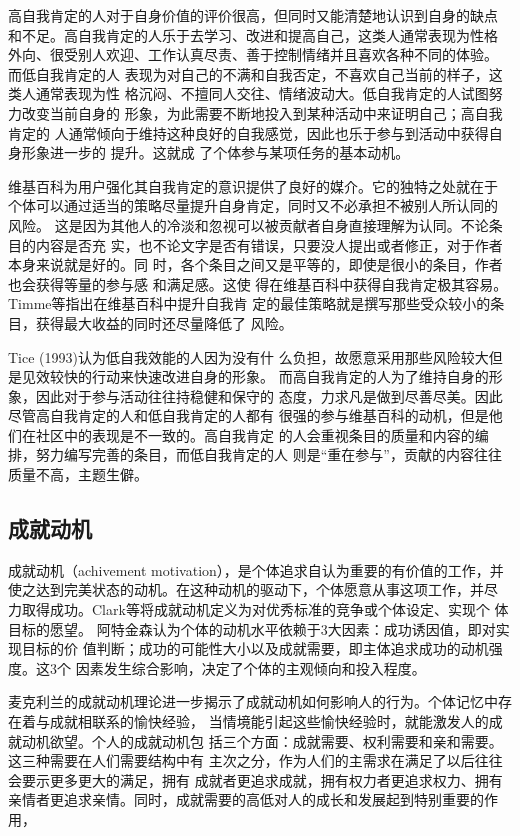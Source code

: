 高自我肯定的人对于自身价值的评价很高，但同时又能清楚地认识到自身的缺点
和不足。高自我肯定的人乐于去学习、改进和提高自己，这类人通常表现为性格
外向、很受别人欢迎、工作认真尽责、善于控制情绪并且喜欢各种不同的体验。
而低自我肯定的人
表现为对自己的不满和自我否定，不喜欢自己当前的样子，这类人通常表现为性
格沉闷、不擅同人交往、情绪波动大。低自我肯定的人试图努力改变当前自身的
形象，为此需要不断地投入到某种活动中来证明自己；高自我肯定的
人通常倾向于维持这种良好的自我感觉，因此也乐于参与到活动中获得自身形象进一步的
提升。这就成
了个体参与某项任务的基本动机。

维基百科为用户强化其自我肯定的意识提供了良好的媒介。它的独特之处就在于
个体可以通过适当的策略尽量提升自身肯定，同时又不必承担不被别人所认同的
风险。
这是因为其他人的冷淡和忽视可以被贡献者自身直接理解为认同。不论条目的内容是否充
实，也不论文字是否有错误，只要没人提出或者修正，对于作者本身来说就是好的。同
时，各个条目之间又是平等的，即使是很小的条目，作者也会获得等量的参与感
和满足感。这使
得在维基百科中获得自我肯定极其容易。Timme等指出在维基百科中提升自我肯
定的最佳策略就是撰写那些受众较小的条目，获得最大收益的同时还尽量降低了
风险。

Tice (1993)认为低自我效能的人因为没有什
么负担，故愿意采用那些风险较大但是见效较快的行动来快速改进自身的形象。
而高自我肯定的人为了维持自身的形象，因此对于参与活动往往持稳健和保守的
态度，力求凡是做到尽善尽美。因此尽管高自我肯定的人和低自我肯定的人都有
很强的参与维基百科的动机，但是他们在社区中的表现是不一致的。高自我肯定
的人会重视条目的质量和内容的编排，努力编写完善的条目，而低自我肯定的人
则是“重在参与”，贡献的内容往往质量不高，主题生僻。

\subsection{成就动机}
\label{sec:achievement}
成就动机（achivement motivation），是个体追求自认为重要的有价值的工作，并
使之达到完美状态的动机。在这种动机的驱动下，个体愿意从事这项工作，并尽
力取得成功。Clark等将成就动机定义为对优秀标准的竞争或个体设定、实现个
体目标的愿望。
阿特金森认为个体的动机水平依赖于3大因素：成功诱因值，即对实现目标的价
值判断；成功的可能性大小以及成就需要，即主体追求成功的动机强度。这3个
因素发生综合影响，决定了个体的主观倾向和投入程度。

麦克利兰的成就动机理论进一步揭示了成就动机如何影响人的行为。个体记忆中存在着与成就相联系的愉快经验，
当情境能引起这些愉快经验时，就能激发人的成就动机欲望。个人的成就动机包
括三个方面：成就需要、权利需要和亲和需要。这三种需要在人们需要结构中有
主次之分，作为人们的主需求在满足了以后往往会要示更多更大的满足，拥有
成就者更追求成就，拥有权力者更追求权力、拥有亲情者更追求亲情。同时，成就需要的高低对人的成长和发展起到特别重要的作用，

